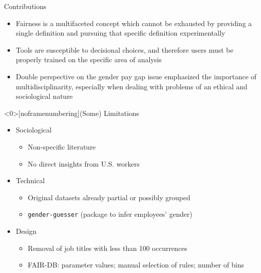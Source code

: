 \documentclass[usenames,dvipsnames]{beamer}
\begin{document}
    
    \begin{frame}{Contributions}
        \begin{itemize}
            \item Fairness is a multifaceted concept which cannot be exhausted by providing a single definition and pursuing that specific definition experimentally
            \item Tools are susceptible to decisional choices, and therefore users must be properly trained on the specific area of analysis
            \item Double perspective on the gender pay gap issue emphasized the importance of multidisciplinarity, especially when dealing with problems of an ethical and sociological nature
        \end{itemize}
    \end{frame}
    
    
    \begin{frame}<0>[noframenumbering]{(Some) Limitations}
        \begin{itemize}
            \item Sociological
            \begin{itemize}
                \item Non-specific literature
                \item No direct insights from U.S. workers
            \end{itemize}
            \item Technical
            \begin{itemize}
                \item Original datasets already partial or possibly grouped
                \item \texttt{gender-guesser} (package to infer employees' gender)
            \end{itemize}
            \item Design
            \begin{itemize}
                \item Removal of job titles with less than 100 occurrences
                \item FAIR-DB: parameter values; manual selection of rules; number of bins
            \end{itemize}
        \end{itemize}
    \end{frame}
    
\end{document}
